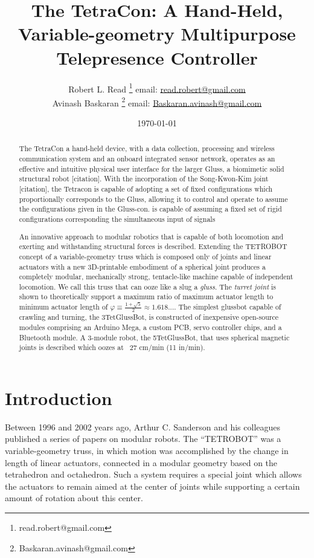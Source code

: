 \documentclass[11pt]{article}
\title{The TetraCon: A Hand-Held, Variable-geometry Multipurpose Telepresence Controller}
\author{Robert L. Read
  \thanks{read.robert@gmail.com}
  email: \href{mailto:read.robert@gmail.com}{read.robert@gmail.com}\\
Avinash Baskaran
  \thanks{Baskaran.avinash@gmail.com}
  email: \href{mailto:Baskaran.avinash@gmail.com}{Baskaran.avinash@gmail.com}
  }
\affil{Public Invention, an educational non-profit.}
\date{\today}
\begin{document}
\maketitle


\begin{abstract}

  The TetraCon a hand-held device, with a data collection, processing and wireless
  communication system and an onboard integrated sensor network, operates as an
  effective and intuitive physical user interface for the larger Gluss, a biomimetic solid structural robot [citation].
  With the incorporation of the Song-Kwon-Kim joint [citation], the
  Tetracon is capable of adopting a set of fixed configurations which proportionally corresponds to the Gluss, allowing it to control
  and operate to assume the configurations given in the Gluss-con. is capable of assuming a fixed set of rigid configurations
  corresponding the simultaneous input of signals


  An innovative approach to modular robotics that is capable of both locomotion and exerting and
  withstanding structural forces is described.
  Extending the TETROBOT\cite{sanderson1996modular,lee2002dynamic,lee1999dynamics,TetrobotBook}
  concept of a variable-geometry
  truss which is composed only of joints and linear actuators
  with a new 3D-printable embodiment of a
  spherical joint\cite{song2003spherical}
  produces a completely modular, mechanically strong, tentacle-like machine capable of independent locomotion.
  We call this truss that can ooze like a slug a \emph{gluss}.
  The \emph{turret joint} is shown to theoretically support a maximum ratio of maximum actuator length to
  minimum actuator length of  $\varphi \equiv \frac{1 + \sqrt{5}}{2} \approx 1.618...$.
  The simplest glussbot capable of crawling and turning, the 3TetGlussBot, is constructed of
  inexpensive open-source modules comprising an Arduino Mega, a custom PCB, servo controller chips, and a Bluetooth module.
  A 3-module robot, the 5TetGlussBot, that uses spherical magnetic joints is described which oozes at ~27 cm/min (11 in/min).
\end{abstract}


\section{Introduction}



Between 1996 and 2002 years ago, Arthur C. Sanderson and his colleagues published a series of
papers\cite{sanderson1996modular,lee2002dynamic,lee1999dynamics} on modular robots.
The ``TETROBOT'' was a variable-geometry truss, in which motion was accomplished by the change
in length of linear actuators, connected in a modular geometry based on the tetrahedron and octahedron.  Such a system
requires a special joint which allows the actuators to remain aimed at the center of joints while supporting
a certain amount of rotation about this center.
\end{document}
